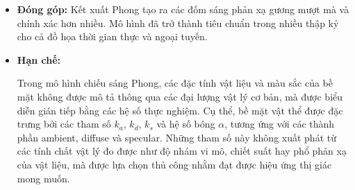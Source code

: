 \begin{enumerate}
\begin{itemize}
\begin{enumerate}
			\item \textit{Tính toán chiếu sáng}\\
			Tại mỗi mảnh, mô hình Phong được áp dụng và tính toán cường độ sáng.\\
			\begin{gather*}
				\vec{R^*} = 2 * (\vec{L} \cdot \vec{N}) * \vec{N} - \vec{L}\\
				\vec{R} = \frac{\vec{R^*}}{||\vec{R^*}||}\\
				Ambient = k_a * I_a\\
				Diffuse = k_d * I_d * max(0, \vec{N} \cdot \vec{L})\\
				Specular = k_s * I_s * max(0, \vec{R} \cdot \vec{V})^\alpha\\
				I = Ambient + Diffuse + Specular
			\end{gather*}
			
			Với:\\
			- $k_a, k_d, k_s$ là hệ số phản xạ môi trường, khuếch tán, phản xạ gương tương ứng với các thành phần ánh sáng.\\
			- $I_a, I_d, I_s$ là cường độ của các thành phần ánh sáng.\\
			- $\vec{N}$ là vector pháp tuyến đơn vị của mảnh.\\
			- $\vec{L}$ là vector đơn vị chỉ hướng từ mảnh đang xét đến nguồn sáng.\\
			- $\vec{R}$ là vector đơn vị phản xạ hướng chiếu sáng.\\
			- $\vec{V}$ là vector đơn vị từ vị trí của mảnh đến camera.
		\end{enumerate}
		
		\item \textbf{Đóng góp:}
		Kết xuất Phong tạo ra các đốm sáng phản xạ gương mượt mà và chính xác hơn nhiều. Mô hình đã trở thành tiêu chuẩn trong nhiều thập kỷ cho cả đồ họa thời gian thực và ngoại tuyến.
		
		\item \textbf{Hạn chế:} 
		
		Trong mô hình chiếu sáng Phong, các đặc tính vật liệu và màu sắc của bề mặt không được mô tả thông qua các đại lượng vật lý cơ bản, mà được biểu diễn gián tiếp bằng các hệ số thực nghiệm. Cụ thể, bề mặt vật thể được đặc trưng bởi các tham số \(k_a\), \(k_d\), \(k_s\) và hệ số bóng \(\alpha\), tương ứng với các thành phần ambient, diffuse và specular. Những tham số này không xuất phát từ các tính chất vật lý đo được như độ nhám vi mô, chiết suất hay phổ phản xạ của vật liệu, mà được lựa chọn thủ công nhằm đạt được hiệu ứng thị giác mong muốn.
		

\end{itemize}
\end{enumerate}
